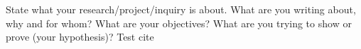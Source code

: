 State what your research/project/inquiry is about. What are you writing about, why and for whom? What are your objectives? 
What are you trying to show or prove (your hypothesis)? Test cite \citep{Reference1}